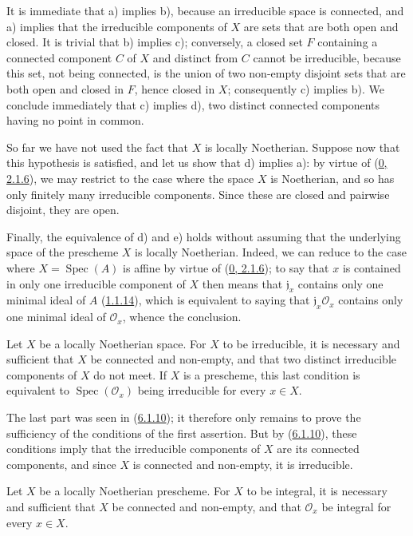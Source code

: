 It is immediate that a) implies b), because an irreducible space is connected,
and a) implies that the irreducible components of $X$ are sets that are both
open and closed. It is trivial that b) implies c); conversely, a
closed set $F$ containing
a connected component $C$ of $X$ and distinct from $C$ cannot be
irreducible, because this set, not being connected, is the union of two
non-empty disjoint sets that are both open and closed in $F$, hence
closed in $X$; consequently c) implies b). We conclude immediately that c)
implies d), two distinct connected components having no point in common.

So far we have not used the fact that $X$ is locally Noetherian.
Suppose now that this hypothesis is satisfied, and let us show that d) implies
a): by virtue of (\hyperref[0.2.1.6]{0, 2.1.6}), we may restrict to the case
where the space $X$ is Noetherian, and so has only finitely many irreducible
components. Since these are closed and pairwise disjoint, they
are open.

Finally, the equivalence of d) and e) holds without assuming that the
underlying space of the prescheme $X$ is locally Noetherian. Indeed, we can
reduce to the case where $X=\operatorname{Spec}(A)$ is affine by virtue of
(\hyperref[0.2.1.6]{0, 2.1.6}); to say that $x$ is contained in only one
irreducible component of $X$ then means that $\mathfrak{j}_x$
contains only one minimal ideal of $A$ (\hyperref[I.1.1.14]{1.1.14}),
which is equivalent to saying that $\mathfrak{j}_x\mathscr{O}_x$ contains only
one minimal ideal of $\mathscr{O}_x$, whence the conclusion.

\begin{corollary}[6.1.11]
\label{I.6.1.11}
Let $X$ be a locally Noetherian space. For $X$ to be irreducible, it is
necessary and sufficient that $X$ be connected and non-empty, and that two
distinct irreducible components of $X$ do not meet. If $X$ is a
prescheme, this last condition is equivalent to
$\operatorname{Spec}(\mathscr{O}_x)$ being irreducible for every $x\in X$.
\end{corollary}

The last part was seen in (\hyperref[I.6.1.10]{6.1.10}); it therefore only
remains to prove the sufficiency of the conditions of the first assertion.
But by (\hyperref[I.6.1.10]{6.1.10}), these conditions imply that
the irreducible components of $X$ are its connected components, and since
$X$ is connected and non-empty, it is irreducible.

\begin{corollary}[6.1.12]
\label{I.6.1.12}
Let $X$ be a locally Noetherian prescheme. For $X$ to be integral, it is
necessary and sufficient that $X$ be connected and non-empty, and that
$\mathscr{O}_x$ be integral for every $x\in X$.
\end{corollary}

